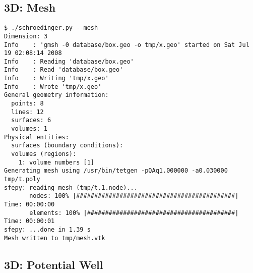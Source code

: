 \subsection{3D: Mesh}

\begin{lstlisting}
$ ./schroedinger.py --mesh
Dimension: 3
Info    : 'gmsh -0 database/box.geo -o tmp/x.geo' started on Sat Jul 19 02:08:14 2008
Info    : Reading 'database/box.geo'
Info    : Read 'database/box.geo'
Info    : Writing 'tmp/x.geo'
Info    : Wrote 'tmp/x.geo'
General geometry information:
  points: 8
  lines: 12
  surfaces: 6
  volumes: 1
Physical entities:
  surfaces (boundary conditions):
  volumes (regions):
    1: volume numbers [1]
Generating mesh using /usr/bin/tetgen -pQAq1.000000 -a0.030000 tmp/t.poly
sfepy: reading mesh (tmp/t.1.node)...
       nodes: 100% |############################################| Time: 00:00:00
       elements: 100% |#########################################| Time: 00:00:01
sfepy: ...done in 1.39 s
Mesh written to tmp/mesh.vtk
\end{lstlisting}

\subsection{3D: Potential Well}

